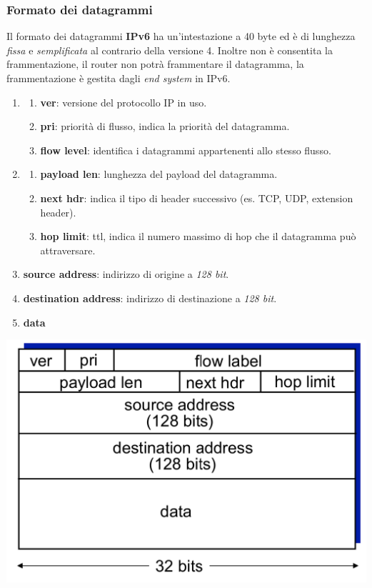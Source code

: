 \subsubsection{Formato dei datagrammi}
Il formato dei datagrammi \textbf{IPv6} ha un'intestazione a 40 byte ed è di lunghezza \textit{fissa} e \textit{semplificata} al contrario della versione 4. Inoltre non è consentita la frammentazione, il router non potrà frammentare il datagramma, la frammentazione è gestita dagli \textit{end system} in IPv6.
\begin{enumerate}
  \item
    \begin{enumerate}
      \item \textbf{ver}: versione del protocollo IP in uso.
      \item \textbf{pri}: priorità di flusso, indica la priorità del datagramma.
      \item \textbf{flow level}: identifica i datagrammi appartenenti allo stesso flusso.
    \end{enumerate}
  \item
    \begin{enumerate}
      \item \textbf{payload len}: lunghezza del payload del datagramma.
      \item \textbf{next hdr}: indica il tipo di header successivo (es. TCP, UDP, extension header).
      \item \textbf{hop limit}: ttl, indica il numero massimo di hop che il datagramma può attraversare.
    \end{enumerate}
  \item \textbf{source address}: indirizzo di origine a \textit{128 bit}.
  \item \textbf{destination address}: indirizzo di destinazione a \textit{128 bit}.
  \item \textbf{data}
\end{enumerate}
\begin{center}
  \includegraphics[width=\textwidth]{img/datagramma_ipv6.png}
\end{center}

